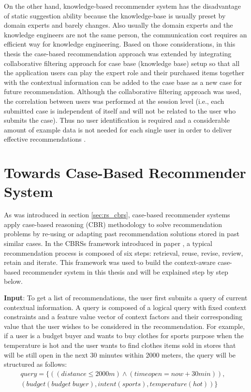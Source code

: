 On the other hand, knowledge-based recommender system has the disadvantage of static suggestion ability because the knowledge-base is usually preset by domain experts and barely changes. Also usually the domain experts and the knowledge engineers are not the same person, the communication cost requires an efficient way for knowledge engineering. Based on those considerations, in this thesis the case-based recommendation approach was extended by integrating collaborative filtering approach for case base (knowledge base) setup so that all the application users can play the expert role and their purchased items together with the contextual information can be added to the case base as a new case for future recommendation. Although the collaborative filtering approach was used, the correlation between users was performed at the session level (i.e., each submitted case is independent of itself and will not be related to the user who submits the case). Thus no user identification is required and a considerable amount of example data is not needed for each single user in order to deliver effective recommendations \cite{ref:26}.

\section{Towards Case-Based Recommender System} \label{sec:tcbrs}

As was introduced in section \ref{sec:rs_cbrs}, case-based recommender systems apply case-based reasoning (CBR) methodology to solve recommendation problems by re-using or adapting past recommendation solutions stored in past similar cases. In the CBRSs framework introduced in paper \cite{ref:22}, a typical recommendation process is composed of six steps: retrieval, reuse, revise, review, retain and iterate. This framework was used to build the context-aware case-based recommender system in this thesis and will be explained step by step below.

\textbf{Input}: To get a list of recommendations, the user first submits a query of current contextual information. A query is composed of a logical query with fixed context constraints and a feature value vector of context factors and their corresponding value that the user wishes to be considered in the recommendation. For example, if a user is a budget buyer and wants to buy clothes for sports purpose when the temperature is hot and the user wants to find clothes items sold in stores that will be still open in the next 30 minutes within 2000 meters, the query will be structured as follows:
\begin{equation} \label{eq:query}
\begin{split}
	query =  \{((distance \leq 2000m)\wedge(timeopen = now+30min)), &\\
	              (budget (budget\; buyer), intent (sports), temperature (hot))\} &
\end{split}
\end{equation}

